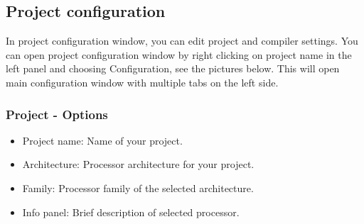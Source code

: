     \clearpage
    \subsection{Project configuration}
        In project configuration window, you can edit project and compiler settings. You can open project configuration
        window by right clicking on project name in the left panel and choosing Configuration, see the pictures below.
        This will open main configuration window with multiple tabs on the left side.

        \subsubsection{Project - Options}
            \begin{itemize}
                \item Project name: Name of your project.
                \item Architecture: Processor architecture for your project.
                \item Family: Processor family of the selected architecture.
                \item Info panel: Brief description of selected processor.
            \end{itemize}

